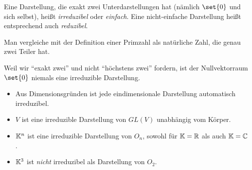 \begin{definition}
Eine Darstellung, die exakt zwei Unterdarstellungen hat (nämlich $\set{0}$ und sich selbst), heißt \emph{irreduzibel} oder \emph{einfach}. Eine nicht-einfache Darstellung heißt entsprechend auch \emph{reduzibel}.
\end{definition}

\begin{remark}
Man vergleiche mit der Definition einer Primzahl als natürliche Zahl, die genau zwei Teiler hat.
\end{remark}

\begin{remark}
Weil wir \enquote{exakt zwei} und nicht \enquote{höchstens zwei} fordern, ist der Nullvektorraum $\set{0}$ niemals eine irreduzible Darstellung.
\end{remark}

\begin{example}
\begin{itemize}
\item Aus Dimensionsgründen ist jede eindimensionale Darstellung automatisch irreduzibel.
\item $V$ ist eine irreduzible Darstellung von $GL(V)$ unabhängig vom Körper.
\item $\mathbb{K}^n$ ist eine irreduzible Darstellung von $O_n$, sowohl für $\mathbb{K}=\mathbb{R}$ als auch $\mathbb{K}=\mathbb{C}$.
\item $\mathbb{K}^3$ ist \emph{nicht} irreduzibel als Darstellung von $O_2$.
\end{itemize}
\end{example}

